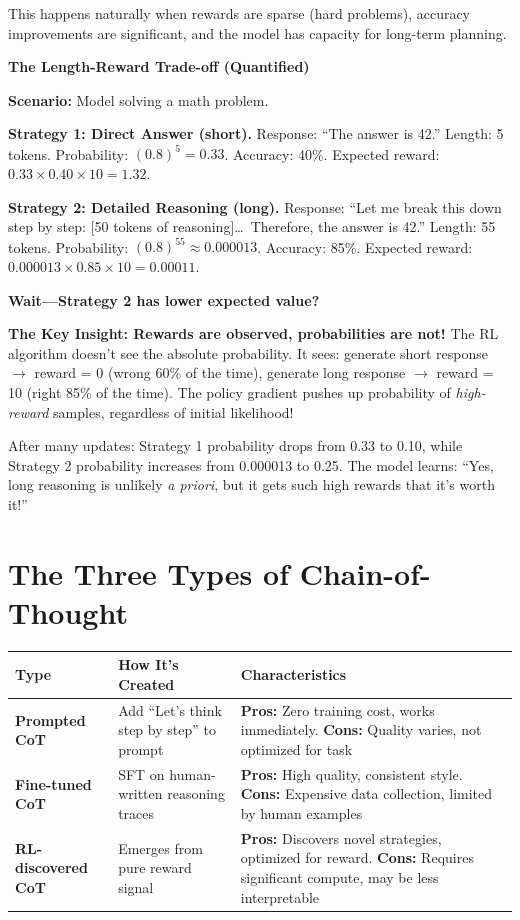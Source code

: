 \begin{chapterenv}
\begin{infobox}
This happens naturally when rewards are sparse (hard problems), accuracy improvements are significant, and the model has capacity for long-term planning.
\end{infobox}

\textbf{The Length-Reward Trade-off (Quantified)}

\textbf{Scenario:} Model solving a math problem.

\textbf{Strategy 1: Direct Answer (short).} Response: ``The answer is 42.'' Length: 5 tokens. Probability: $(0.8)^5 = 0.33$. Accuracy: 40\%. Expected reward: $0.33 \times 0.40 \times 10 = 1.32$.

\textbf{Strategy 2: Detailed Reasoning (long).} Response: ``Let me break this down step by step: [50 tokens of reasoning]\ldots\ Therefore, the answer is 42.'' Length: 55 tokens. Probability: $(0.8)^{55} \approx 0.000013$. Accuracy: 85\%. Expected reward: $0.000013 \times 0.85 \times 10 = 0.00011$.

\textbf{Wait---Strategy 2 has lower expected value?}

\textbf{The Key Insight: Rewards are observed, probabilities are not!} The RL algorithm doesn't see the absolute probability. It sees: generate short response $\to$ reward = 0 (wrong 60\% of the time), generate long response $\to$ reward = 10 (right 85\% of the time). The policy gradient pushes up probability of \textit{high-reward} samples, regardless of initial likelihood!

After many updates: Strategy 1 probability drops from 0.33 to 0.10, while Strategy 2 probability increases from 0.000013 to 0.25. The model learns: ``Yes, long reasoning is unlikely \textit{a priori}, but it gets such high rewards that it's worth it!''

\section{The Three Types of Chain-of-Thought}

\begin{center}
\begin{tabular}{p{}p{}p{}}
\toprule
\textbf{Type} & \textbf{How It's Created} & \textbf{Characteristics} \\
\midrule
\textbf{Prompted CoT} & Add ``Let's think step by step'' to prompt & \textbf{Pros:} Zero training cost, works immediately. \textbf{Cons:} Quality varies, not optimized for task \\
\textbf{Fine-tuned CoT} & SFT on human-written reasoning traces & \textbf{Pros:} High quality, consistent style. \textbf{Cons:} Expensive data collection, limited by human examples \\
\textbf{RL-discovered CoT} & Emerges from pure reward signal & \textbf{Pros:} Discovers novel strategies, optimized for reward. \textbf{Cons:} Requires significant compute, may be less interpretable \\
\bottomrule
\end{tabular}
\end{center}


\end{chapterenv}
